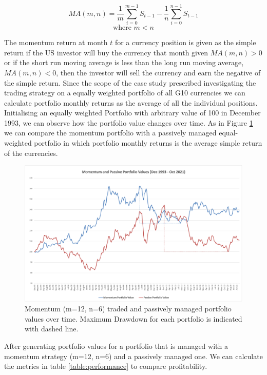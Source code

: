 \documentclass{article}
\begin{document}
\begin{equation}\label{eq:4}
MA(m,n) = \frac{1}{m}\sum_{i=0}^{m-1} S_{t-1} - \frac{1}{n}\sum_{i=0}^{n-1} S_{t-1}
\end{equation}
\[
\text{where  } m < n
\]

The momentum return at month $t$ for a currency position is given as the simple return if the US investor will buy the currency that month given $MA(m,n)>0$ or if the short run moving average is less than the long run moving average, $MA(m,n) < 0$, then the investor will sell the currency and earn the negative of the simple return. Since the scope of the case study prescribed investigating the trading strategy on a equally weighted portfolio of all G10 currencies we can calculate portfolio monthly returns as the average of all the individual positions. Initialising an equally weighted Portfolio with arbitrary value of 100 in December 1993, we can observe how the portfolio value changes over time. As in Figure \ref{fig:Portfolio Values} we can compare the momentum portfolio with a passively managed equal-weighted portfolio in which portfolio monthly returns is the average simple return of the currencies.  

\begin{figure}[h!]
    \centering
    \includegraphics[width=0.75\linewidth]{Figure 2.png}
    \captionsetup{font=small, width = 0.75\linewidth}
    \caption{Momentum (m=12, n=6) traded and passively managed portfolio values over time. Maximum Drawdown for each portfolio is indicated with dashed line. }
    \label{fig:Portfolio Values}
\end{figure}

After generating portfolio values for a portfolio that is managed with a momentum strategy (m=12, n=6) and a passively managed one. We can calculate the metrics in table \ref{table:performance} to compare profitability. 
\end{document}

